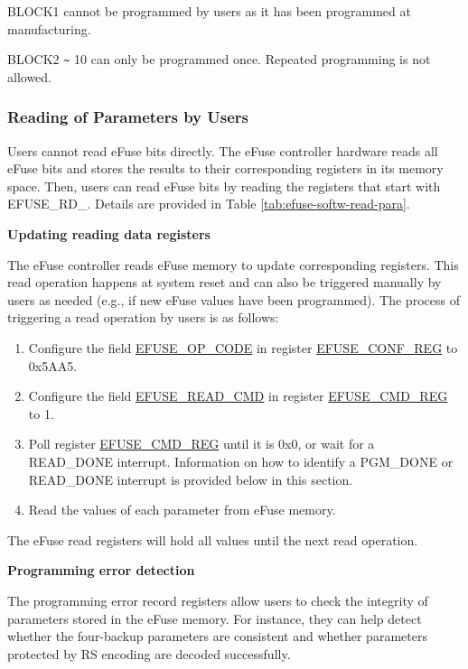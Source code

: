 \documentclass[main\_\_EN.tex]{subfiles}
\begin{document}
BLOCK1 cannot be programmed by users as it has been programmed at manufacturing.

BLOCK2 \verb+~+ 10 can only be programmed once. Repeated programming is not allowed. 

\subsubsection{Reading of Parameters by Users}
\label{sec:efuse-software-read-para}

Users cannot read eFuse bits directly. The eFuse controller hardware reads all eFuse bits and stores the results to their corresponding registers in its memory space. Then, users can read eFuse bits by reading the registers that start with EFUSE\_RD\_. Details are provided in Table \ref{tab:efuse-softw-read-para}.



{\bfseries Updating reading data registers}
\label{sec:efuse-update-reg}

The eFuse controller reads eFuse memory to update corresponding registers. This read operation happens at system reset and can also be triggered manually by users as needed (e.g., if new eFuse values have been programmed). The process of triggering a read operation by users is as follows:

\begin{enumerate}
    \item Configure the field \hyperref[fielddesc:EFUSEOPCODE]{EFUSE\_OP\_CODE} in register \hyperref[regdesc:EFUSECONFREG]{EFUSE\_CONF\_REG} to 0x5AA5.
    \item Configure the field \hyperref[fielddesc:EFUSEREADCMD]{EFUSE\_READ\_CMD} in register \hyperref[regdesc:EFUSECMDREG]{EFUSE\_CMD\_REG} to 1.
    \item Poll register \hyperref[regdesc:EFUSECMDREG]{EFUSE\_CMD\_REG} until it is 0x0, or wait for a READ\_DONE interrupt. Information on how to identify a PGM\_DONE or READ\_DONE interrupt is provided below in this section.
    \item Read the values of each parameter from eFuse memory.
\end{enumerate}
The eFuse read registers will hold all values until the next read operation.

{\bfseries Programming error detection}

The programming error record registers allow users to check the integrity of parameters stored in the eFuse memory. For instance, they can help detect whether the four-backup parameters are consistent and whether parameters protected by RS encoding are decoded successfully.
\end{document}
